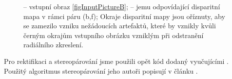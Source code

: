 \documentclass[11pt,oneside,a4paper,pdftex]{article}   %
\begin{document}
			\begin{figure}[htbp]
					\centering
				\caption{ -- vstupní obraz \ref{figInputPictureB}; 
					 -- jemu odpovídající disparitní mapa v rámci páru
					(b,f);
					Okraje disparitní mapy jsou oříznuty, aby se zamezilo vzniku nežádoucích artefaktů,
					které by vznikly kvůli černým okrajům vstupního obrázku vzniklým při odstranění
					radiálního zkreslení.}
				\label{figSourcePictureAndDisparityMapForTheBFPair}
			\end{figure}
	
	Pro rektifikaci a stereopárování jsme použili opět kód dodaný vyučujícími \cite{code_repo}. Použitý
	algoritmus stereopárování jeho autoři popisují v článku \cite{Cech-BenCOS-CVPR-2007}.
\end{document}
